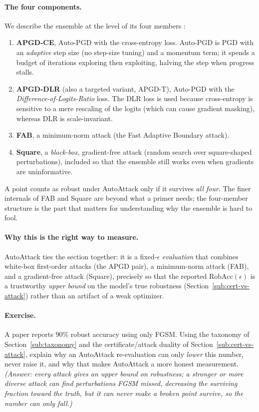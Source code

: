 \paragraph{The four components.} We describe the ensemble at the level of its four members \citep{croce2020reliable}:
\begin{enumerate}[label=\textbf{\arabic*.},nosep]
  \item \textbf{APGD-CE}, Auto-PGD with the cross-entropy loss. Auto-PGD is PGD with an \emph{adaptive} step size (no step-size tuning) and a momentum term; it spends a budget of iterations exploring then exploiting, halving the step when progress stalls.
  \item \textbf{APGD-DLR} (also a targeted variant, APGD-T), Auto-PGD with the \emph{Difference-of-Logits-Ratio} loss. The DLR loss is used because cross-entropy is sensitive to a mere rescaling of the logits (which can cause gradient masking), whereas DLR is scale-invariant.
  \item \textbf{FAB}, a minimum-norm attack (the Fast Adaptive Boundary attack).
  \item \textbf{Square}, a \emph{black-box}, gradient-free attack (random search over square-shaped perturbations), included so that the ensemble still works even when gradients are uninformative.
\end{enumerate}
A point counts as robust under AutoAttack only if it survives \emph{all four}. The finer internals of FAB and Square are beyond what a primer needs; the four-member structure is the part that matters for understanding why the ensemble is hard to fool.

\paragraph{Why this is the right way to measure.} AutoAttack ties the section together: it is a fixed-$\epsilon$ \emph{evaluation} that combines white-box first-order attacks (the APGD pair), a minimum-norm attack (FAB), and a gradient-free attack (Square), precisely so that the reported $\mathrm{RobAcc}(\epsilon)$ is a trustworthy \emph{upper bound} on the model's true robustness (Section~\ref{sub:cert-vs-attack}) rather than an artifact of a weak optimizer.

\paragraph{Exercise.} A paper reports $90\%$ robust accuracy using only FGSM. Using the taxonomy of Section~\ref{sub:taxonomy} and the certificate/attack duality of Section~\ref{sub:cert-vs-attack}, explain why an AutoAttack re-evaluation can only \emph{lower} this number, never raise it, and why that makes AutoAttack a more honest measurement. \emph{(Answer: every attack gives an upper bound on robustness; a stronger or more diverse attack can find perturbations FGSM missed, decreasing the surviving fraction toward the truth, but it can never make a broken point survive, so the number can only fall.)}

